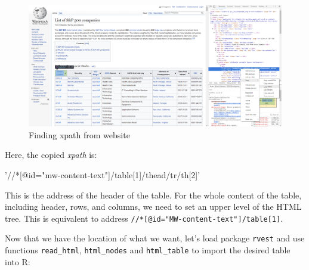 \documentclass[
  12pt,
]{book}
\newenvironment{Shaded}{\begin{snugshade}}{\end{snugshade}}
\newcommand{\StringTok}[1]{\textcolor[rgb]{0.5,0.5,0.5}{#1}}
\begin{document}
\begin{figure}[!htbp]

{\centering \includegraphics[width=0.75\linewidth]{figs/SP500-Wikipedia_webscraping} 

}

\caption{Finding xpath from website}\label{fig:SP500-Wikipedia-webscraping}
\end{figure}

Here, the copied \emph{xpath} is:

\begin{Shaded}
\begin{Highlighting}[]
\StringTok{'//*[@id="mw-content-text"]/table[1]/thead/tr/th[2]'}
\end{Highlighting}
\end{Shaded}

This is the address of the header of the table. For the whole content of the table, including header, rows, and columns, we need to set an upper level of the HTML tree. This is equivalent to address \texttt{//*{[}@id="MW-content-text"{]}/table{[}1{]}}.

Now that we have the location of what we want, let's load package \texttt{rvest} \citep{R-rvest} and use functions \texttt{read\_html}, \texttt{html\_nodes} and \texttt{html\_table} to import the desired table into R:    
\end{document}
